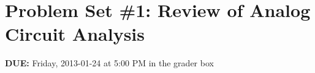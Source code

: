 


\section*{Problem Set \#1: Review of Analog Circuit Analysis}

\textbf{DUE:} Friday, 2013-01-24 at 5:00 PM in the grader box













